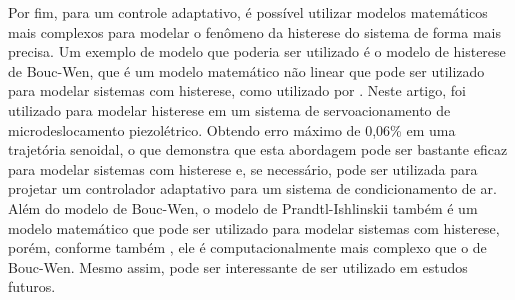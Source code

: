 Por fim, para um controle adaptativo, é possível utilizar modelos matemáticos mais complexos para modelar o fenômeno da histerese do sistema de forma mais precisa. Um exemplo de modelo que poderia ser utilizado é o modelo de histerese de Bouc-Wen, que é um modelo matemático não linear que pode ser utilizado para modelar sistemas com histerese, como utilizado por \textcite{ZHANG2024112387}. Neste artigo, foi utilizado para modelar histerese em um sistema de servoacionamento de microdeslocamento piezolétrico. Obtendo erro máximo de 0,06\% em uma trajetória senoidal, o que demonstra que esta abordagem pode ser bastante eficaz para modelar sistemas com histerese e, se necessário, pode ser utilizada para projetar um controlador adaptativo para um sistema de condicionamento de ar. Além do modelo de Bouc-Wen, o modelo de Prandtl-Ishlinskii também é um modelo matemático que pode ser utilizado para modelar sistemas com histerese, porém, conforme também \textcite{ZHANG2024112387}, ele é computacionalmente mais complexo que o de Bouc-Wen. Mesmo assim, pode ser interessante de ser utilizado em estudos futuros.






